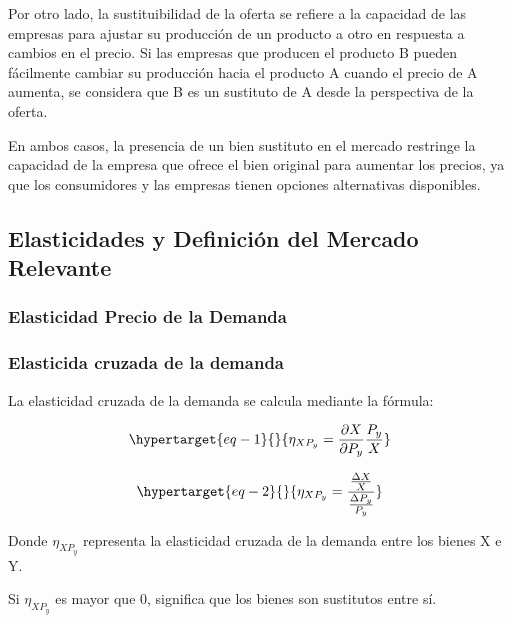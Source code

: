 \documentclass[
  letterpaper,
  DIV=11,
  numbers=noendperiod]{scrartcl}
\begin{document}
Por otro lado, la sustituibilidad de la oferta se refiere a la capacidad
de las empresas para ajustar su producción de un producto a otro en
respuesta a cambios en el precio. Si las empresas que producen el
producto B pueden fácilmente cambiar su producción hacia el producto A
cuando el precio de A aumenta, se considera que B es un sustituto de A
desde la perspectiva de la oferta.

En ambos casos, la presencia de un bien sustituto en el mercado
restringe la capacidad de la empresa que ofrece el bien original para
aumentar los precios, ya que los consumidores y las empresas tienen
opciones alternativas disponibles.

\hypertarget{elasticidades-y-definiciuxf3n-del-mercado-relevante}{%
\subsection{Elasticidades y Definición del Mercado
Relevante}\label{elasticidades-y-definiciuxf3n-del-mercado-relevante}}

\hypertarget{elasticidad-precio-de-la-demanda}{%
\subsubsection{Elasticidad Precio de la
Demanda}\label{elasticidad-precio-de-la-demanda}}

\hypertarget{elasticida-cruzada-de-la-demanda}{%
\subsubsection{Elasticida cruzada de la
demanda}\label{elasticida-cruzada-de-la-demanda}}

La elasticidad cruzada de la demanda se calcula mediante la fórmula:

\begin{equation}\protect\hypertarget{eq-1}{}{
\eta_{XP_{y}} = \frac{\partial X}{\partial P_{y}} \frac{P_{y}}{X}
}\label{eq-1}\end{equation}

\begin{equation}\protect\hypertarget{eq-2}{}{
\eta_{XP_{y}} = \frac{\frac{\Delta X}{X}}{\frac{\Delta P_{y}}{P_{y}}}
}\label{eq-2}\end{equation}

Donde \(\eta_{XP_y}\) representa la elasticidad cruzada de la demanda
entre los bienes X e Y.

Si \(\eta_{XP_y}\) es mayor que 0, significa que los bienes son
sustitutos entre sí.
\end{document}
